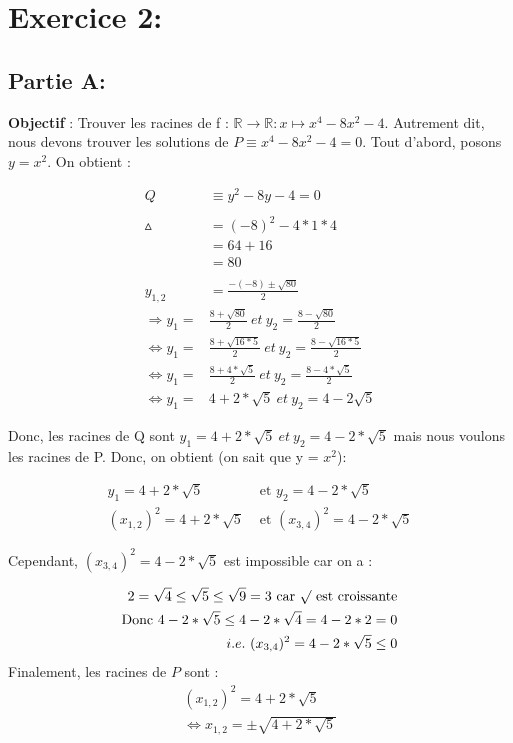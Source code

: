 \documentclass[a4paper, 12pt]{article}
\begin{document}
\newpage

\section{Exercice 2:}

\subsection{Partie A:}

\textbf{Objectif} : Trouver les racines de f : \( \mathbb{R} \rightarrow \mathbb{R} : x \mapsto x^4 - 8x^2 - 4 \).
Autrement dit, nous devons trouver les solutions de \( P \equiv x^4 - 8x^2 - 4 = 0 \). \newline
Tout d'abord, posons \( y = x^2 \).
On obtient : 

\begin{align*}
	Q &\equiv y^2 - 8y - 4 = 0\\ \\
	\vartriangle &= (-8)^2 - 4 * 1 * 4 \\
	       &= 64 + 16 \\
	       &= 80 \\ \\
   y_{1,2} &= \frac{-(-8) \pm \sqrt{80}}{2} \\
   \Rightarrow y_1 = &\frac{8 + \sqrt{80}}{2} ~ et ~ y_2 = \frac{8 - \sqrt{80}}{2} \\
   \Leftrightarrow y_1 = &\frac{8 + \sqrt{16 * 5}}{2} ~ et ~ y_2 = \frac{8 - \sqrt{16 * 5}}{2} \\
   \Leftrightarrow y_1 = &\frac{8 + 4 * \sqrt{5}}{2} ~ et ~ y_2 = \frac{8 - 4 * \sqrt{5}}{2} \\
    \Leftrightarrow y_1 = &4 + 2 * \sqrt{5} ~ et ~ y_2 = 4 - 2\sqrt{5}
\end{align*}


Donc, les racines de Q sont \( y_1 = 4 + 2 * \sqrt{5} ~ et ~ y_2 = 4 - 2 * \sqrt{5}  \) mais nous voulons les racines de P. Donc, on obtient (on sait que y = $x^2$):


\begin{align*}
	y_1 = 4 + 2 * \sqrt{5}&\text{ et }y_2 = 4 - 2 * \sqrt{5} \\
	(x_{1,2})^2 = 4 + 2 * \sqrt{5}&\text{ et }(x_{3,4})^2 = 4 - 2 * \sqrt{5}
\end{align*}

	Cependant, $(x_{3,4})^2 = 4 - 2 * \sqrt{5}$ est impossible car on a : 
	
\begin{align*}
	2 = \sqrt{4} \leq \sqrt{5} \leq \sqrt{9} = 3 \text{ car } \surd \text{ est croissante} \\
	\text{Donc } 4 - 2 * \sqrt{5} \leq 4 - 2 * \sqrt{4} = 4 - 2 * 2 = 0 \\
	i.e. ~ (x_{3,4})^2 = 4 - 2 * \sqrt{5} \leq 0 
\end{align*}
Finalement, les racines de $P$ sont : \\
\begin{align*}
	(x_{1,2})^2 = 4 + 2 * \sqrt{5} \\
	\Leftrightarrow x_{1,2} = \pm \sqrt{4 + 2 * \sqrt{5}}	
\end{align*}
\end{document}
